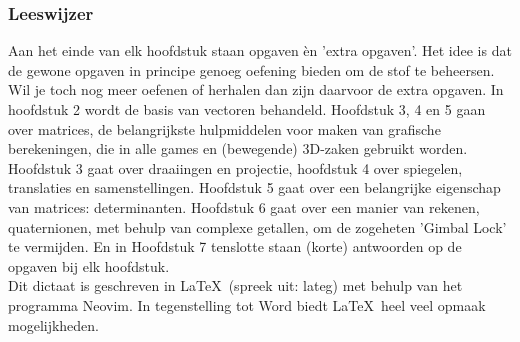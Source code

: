 \subsubsection{Leeswijzer}
Aan het einde van elk hoofdstuk staan opgaven èn 'extra opgaven'. Het idee is dat de gewone opgaven in principe genoeg oefening bieden om de stof te beheersen. Wil je toch nog meer oefenen of herhalen dan zijn daarvoor de extra opgaven. In hoofdstuk 2 wordt de basis van vectoren behandeld. Hoofdstuk 3, 4 en 5 gaan over matrices, de belangrijkste hulpmiddelen voor maken van grafische berekeningen, die in alle games en (bewegende) 3D-zaken gebruikt worden. Hoofdstuk 3 gaat over draaiingen en projectie, hoofdstuk 4 over spiegelen, translaties en samenstellingen. Hoofdstuk 5 gaat over een belangrijke eigenschap van matrices: determinanten. Hoofdstuk 6 gaat over een manier van rekenen, quaternionen, met behulp van complexe getallen, om de zogeheten 'Gimbal Lock' te vermijden. En in Hoofdstuk 7 tenslotte staan (korte) antwoorden op de opgaven bij elk hoofdstuk. \\

Dit dictaat is geschreven in \LaTeX\ (spreek uit: lateg) met behulp van het programma Neovim. In tegenstelling tot Word biedt  \LaTeX \   heel veel opmaak mogelijkheden.

